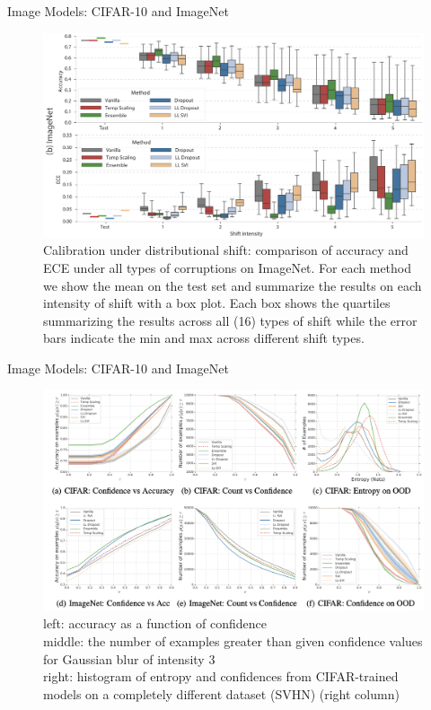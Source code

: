 \documentclass{beamer}
\begin{document}
\begin{frame}{Image Models: CIFAR-10 and ImageNet}
    \begin{figure}{}
        \centering
        \includegraphics[scale=0.24]{images/imagenet.png}
        \caption{Calibration under distributional shift:  comparison of accuracy and ECE under
        all types of corruptions on ImageNet. For each method we show the mean on the test set and summarize the results on each intensity of shift with a box plot. Each box shows the quartiles summarizing the results across all (16) types of shift while the error bars indicate the min
        and max across different shift types.
        }
        \label{fig:enter-label}
    \end{figure}
\end{frame}

\begin{frame}{Image Models: CIFAR-10 and ImageNet}
    \begin{figure}{}
        \centering
        \includegraphics[scale=0.41]{images/figure3.png}
        \caption{left: accuracy as a function of confidence \\ middle: the number of examples greater than given confidence values for Gaussian blur of intensity 3\\ right: histogram of entropy and confidences from CIFAR-trained models on a completely different dataset (SVHN) (right column)}
        \label{fig:enter-label}
    \end{figure}
\end{frame}
\end{document}
